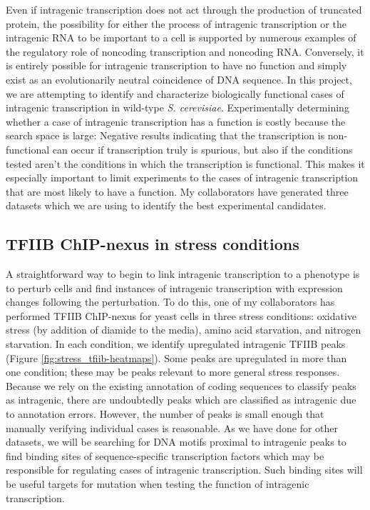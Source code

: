 \documentclass[9pt, letterpaper]{article}
\begin{document}
Even if intragenic transcription does not act through the production of truncated protein, the possibility for either the process of intragenic transcription or the intragenic RNA to be important to a cell is supported by numerous examples of the regulatory role of noncoding transcription and noncoding RNA. Conversely, it is entirely possible for intragenic transcription to have no function and simply exist as an evolutionarily neutral coincidence of DNA sequence. In this project, we are attempting to identify and characterize biologically functional cases of intragenic transcription in wild-type \textit{S. cerevisiae}. Experimentally determining whether a case of intragenic transcription has a function is costly because the search space is large: Negative results indicating that the transcription is non-functional can occur if transcription truly is spurious, but also if the conditions tested aren't the conditions in which the transcription is functional. This makes it especially important to limit experiments to the cases of intragenic transcription that are most likely to have a function. My collaborators have generated three datasets which we are using to identify the best experimental candidates.

\subsection{TFIIB ChIP-nexus in stress conditions}

A straightforward way to begin to link intragenic transcription to a phenotype is to perturb cells and find instances of intragenic transcription with expression changes following the perturbation. To do this, one of my collaborators has performed TFIIB ChIP-nexus for yeast cells in three stress conditions: oxidative stress (by addition of diamide to the media), amino acid starvation, and nitrogen starvation. In each condition, we identify upregulated intragenic TFIIB peaks (Figure \ref{fig:stress_tfiib-heatmaps}). Some peaks are upregulated in more than one condition; these may be peaks relevant to more general stress responses. Because we rely on the existing annotation of coding sequences to classify peaks as intragenic, there are undoubtedly peaks which are classified as intragenic due to annotation errors. However, the number of peaks is small enough that manually verifying individual cases is reasonable. As we have done for other datasets, we will be searching for DNA motifs proximal to intragenic peaks to find binding sites of sequence-specific transcription factors which may be responsible for regulating cases of intragenic transcription. Such binding sites will be useful targets for mutation when testing the function of intragenic transcription.
\end{document}
